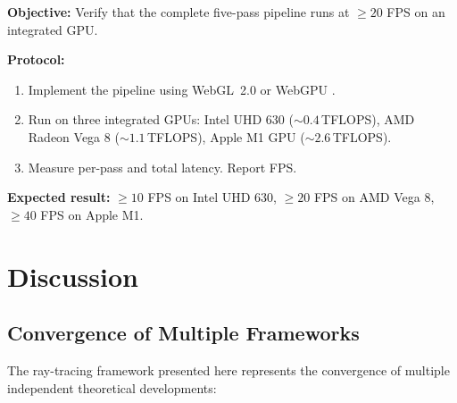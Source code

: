 \documentclass[11pt,twocolumn,a4paper]{article}
\begin{document}
\textbf{Objective:} Verify that the complete five-pass pipeline runs
at $\geq 20$ FPS on an integrated GPU.

\textbf{Protocol:}
\begin{enumerate}[label=(\roman*),leftmargin=*]
\item Implement the pipeline using WebGL~2.0
  \citep{khronos2024} or WebGPU \citep{webgpu2024}.
\item Run on three integrated GPUs: Intel UHD 630 ($\sim\!0.4$\,TFLOPS),
  AMD Radeon Vega 8 ($\sim\!1.1$\,TFLOPS), Apple M1 GPU
  ($\sim\!2.6$\,TFLOPS).
\item Measure per-pass and total latency. Report FPS.
\end{enumerate}

\textbf{Expected result:} $\geq 10$ FPS on Intel UHD 630, $\geq 20$
FPS on AMD Vega 8, $\geq 40$ FPS on Apple M1.



\section{Discussion}
\label{sec:discussion}

\subsection{Convergence of Multiple Frameworks}

The ray-tracing framework presented here represents the convergence
of multiple independent theoretical developments:
\end{document}
